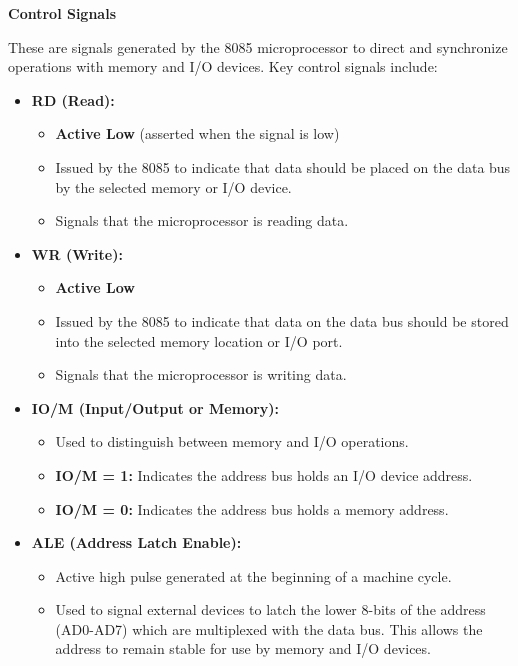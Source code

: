 \documentclass[
]{article}
\begin{document}
\textbf{Control Signals}

These are signals generated by the 8085 microprocessor to direct and
synchronize operations with memory and I/O devices. Key control signals
include:

\begin{itemize}
\item
  \textbf{RD (Read):}

  \begin{itemize}
  \item
    \textbf{Active Low} (asserted when the signal is low)
  \item
    Issued by the 8085 to indicate that data should be placed on the
    data bus by the selected memory or I/O device.
  \item
    Signals that the microprocessor is reading data.
  \end{itemize}
\item
  \textbf{WR (Write):}

  \begin{itemize}
  \item
    \textbf{Active Low}
  \item
    Issued by the 8085 to indicate that data on the data bus should be
    stored into the selected memory location or I/O port.
  \item
    Signals that the microprocessor is writing data.
  \end{itemize}
\item
  \textbf{IO/M (Input/Output or Memory):}

  \begin{itemize}
  \item
    Used to distinguish between memory and I/O operations.
  \item
    \textbf{IO/M = 1:} Indicates the address bus holds an I/O device
    address.
  \item
    \textbf{IO/M = 0:} Indicates the address bus holds a memory address.
  \end{itemize}
\item
  \textbf{ALE (Address Latch Enable):}

  \begin{itemize}
  \item
    Active high pulse generated at the beginning of a machine cycle.
  \item
    Used to signal external devices to latch the lower 8-bits of the
    address (AD0-AD7) which are multiplexed with the data bus. This
    allows the address to remain stable for use by memory and I/O
    devices.
  \end{itemize}
\end{itemize}
\end{document}
